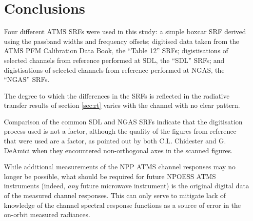 \section{Conclusions}
Four different ATMS SRFs were used in this study: a simple boxcar SRF derived using the passband widths and frequency offsets; digitised data taken from the ATMS PFM Calibration Data Book\cite{ATMS_PFM_CalLog}, the ``Table 12'' SRFs; digistisations of selected channels from reference \cite{ATMS_PFM_CalLog} performed at SDL, the ``SDL'' SRFs; and digistisations of selected channels from reference \cite{ATMS_PFM_CalLog} performed at NGAS, the ``NGAS'' SRFs.

The degree to which the differences in the SRFs is reflected in the radiative transfer results of section \ref{sec:rt} varies with the channel with no clear pattern.

Comparison of the common SDL and NGAS SRFs indicate that the digitisation process used is not a factor, although the quality of the figures from reference \cite{ATMS_PFM_CalLog} that were used are a factor, as pointed out by both C.L. Chidester and G. DeAmici when they encountered non-orthogonal axes in the scanned figures.

While additional measurements of the NPP ATMS channel responses may no longer be possible, what should be required for future NPOESS ATMS instruments (indeed, \textsl{any} future microwave instrument) is the original digital data of the measured channel responses. This can only serve to mitigate lack of knowledge of the channel spectral response functions as a source of error in the on-orbit measured radiances.

